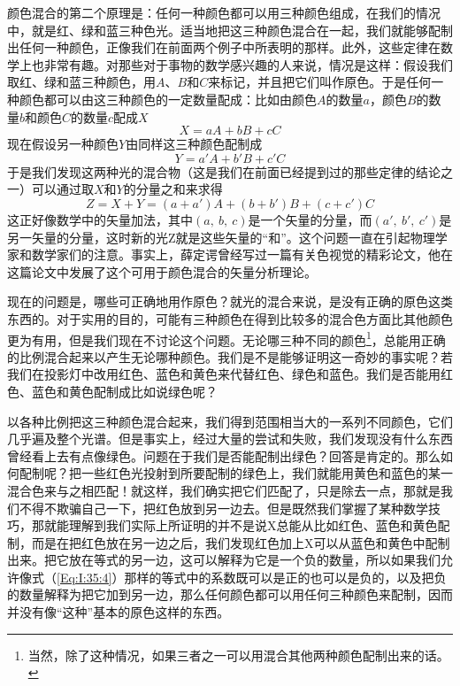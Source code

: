 颜色混合的第二个原理是：任何一种颜色都可以用三种颜色组成，在我们的情况中，就是红、绿和蓝三种色光。适当地把这三种颜色混合在一起，我们就能够配制出任何一种颜色，正像我们在前面两个例子中所表明的那样。此外，这些定律在数学上也非常有趣。对那些对于事物的数学感兴趣的人来说，情况是这样：假设我们取红、绿和蓝三种颜色，用$A$、$B$和$C$来标记，并且把它们叫作原色。于是任何一种颜色都可以由这三种颜色的一定数量配成：比如由颜色$A$的数量$a$，颜色$B$的数量$b$和颜色$C$的数量$c$配成$X$
\begin{equation}
    \label{Eq:I:35:4}
    X = aA + bB + cC
\end{equation}
现在假设另一种颜色$Y$由同样这三种颜色配制成
\begin{equation}
    \label{Eq:I:35:5}
    Y = a'A + b'B + c'C
\end{equation}
于是我们发现这两种光的混合物（这是我们在前面已经提到过的那些定律的结论之一）可以通过取$X$和$Y$的分量之和来求得
\begin{equation}
    \label{Eq:I:35:6}
    Z = X + Y = (a + a')A + (b + b')B + (c + c')C
\end{equation}
这正好像数学中的矢量加法，其中$(a,~b,~c)$是一个矢量的分量，而$(a',~b',~c')$是另一矢量的分量，这时新的光Z就是这些矢量的“和”。这个问题一直在引起物理学家和数学家们的注意。事实上，薛定谔曾经写过一篇有关色视觉的精彩论文，他在这篇论文中发展了这个可用于颜色混合的矢量分析理论。

现在的问题是，哪些可正确地用作原色？就光的混合来说，是没有正确的原色这类东西的。对于实用的目的，可能有三种颜色在得到比较多的混合色方面比其他颜色更为有用，但是我们现在不讨论这个问题。无论哪三种不同的颜色\footnote{当然，除了这种情况，如果三者之一可以用混合其他两种颜色配制出来的话。}，总能用正确的比例混合起来以产生无论哪种颜色。我们是不是能够证明这一奇妙的事实呢？若我们在投影灯中改用红色、蓝色和黄色来代替红色、绿色和蓝色。我们是否能用红色、蓝色和黄色配制成比如说绿色呢？

以各种比例把这三种颜色混合起来，我们得到范围相当大的一系列不同颜色，它们几乎遍及整个光谱。但是事实上，经过大量的尝试和失败，我们发现没有什么东西曾经看上去有点像绿色。问题在于我们是否能配制出绿色？回答是肯定的。那么如何配制呢？把一些红色光投射到所要配制的绿色上，我们就能用黄色和蓝色的某一混合色来与之相匹配！就这样，我们确实把它们匹配了，只是除去一点，那就是我们不得不欺骗自己一下，把红色放到另一边去。但是既然我们掌握了某种数学技巧，那就能理解到我们实际上所证明的并不是说X总能从比如红色、蓝色和黄色配制，而是在把红色放在另一边之后，我们发现红色加上X可以从蓝色和黄色中配制出来。把它放在等式的另一边，这可以解释为它是一个负的数量，所以如果我们允许像式（\ref{Eq:I:35:4}）那样的等式中的系数既可以是正的也可以是负的，以及把负的数量解释为把它加到另一边，那么任何颜色都可以用任何三种颜色来配制，因而并没有像“这种”基本的原色这样的东西。

